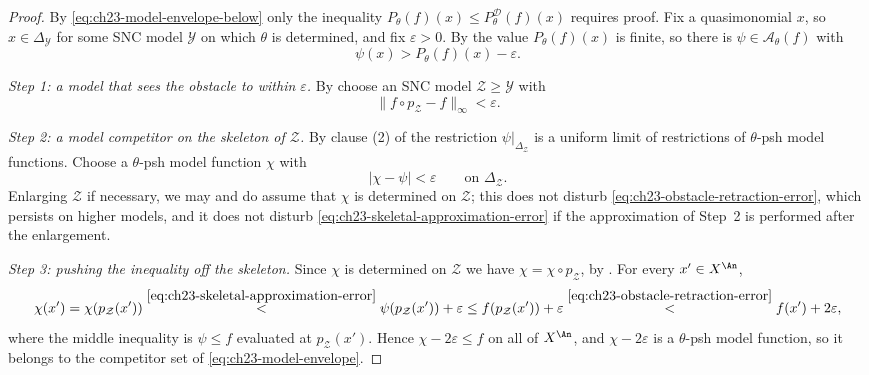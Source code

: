 \begin{proof}
By \eqref{eq:ch23-model-envelope-below} only the inequality
\(P_\theta(f)(x)\leq P^{\mathcal D}_\theta(f)(x)\) requires proof.  Fix a
quasimonomial \(x\), so \(x\in\Delta_{\mathcal Y}\) for some SNC model
\(\mathcal Y\) on which \(\theta\) is determined, and fix \(\varepsilon>0\).
By  the value \(P_\theta(f)(x)\) is finite,
so there is \(\psi\in\mathcal A_\theta(f)\) with
\begin{equation}\label{eq:ch23-competitor-near-x}
 \psi(x)>P_\theta(f)(x)-\varepsilon .
\end{equation}

\emph{Step 1: a model that sees the obstacle to within \(\varepsilon\).}
By  choose an SNC model
\(\mathcal Z\geq\mathcal Y\) with
\begin{equation}\label{eq:ch23-obstacle-retraction-error}
 \|f\circ p_{\mathcal Z}-f\|_\infty<\varepsilon .
\end{equation}

\emph{Step 2: a model competitor on the skeleton of \(\mathcal Z\).}
By clause (2) of  the restriction
\(\psi|_{\Delta_{\mathcal Z}}\) is a uniform limit of restrictions of
\(\theta\)-psh model functions.  Choose a \(\theta\)-psh model function
\(\chi\) with
\begin{equation}\label{eq:ch23-skeletal-approximation-error}
 \bigl|\chi-\psi\bigr|<\varepsilon
 \qquad\text{on }\Delta_{\mathcal Z}.
\end{equation}
Enlarging \(\mathcal Z\) if necessary, we may and do assume that \(\chi\) is
determined on \(\mathcal Z\); this does not disturb
\eqref{eq:ch23-obstacle-retraction-error}, which persists on higher models,
and it does not disturb \eqref{eq:ch23-skeletal-approximation-error} if the
approximation of Step~2 is performed after the enlargement.

\emph{Step 3: pushing the inequality off the skeleton.}  Since \(\chi\) is
determined on \(\mathcal Z\) we have \(\chi=\chi\circ p_{\mathcal Z}\), by
.  For every \(x'\in X^{\An}\),
\[
 \chi(x')=\chi(p_{\mathcal Z}(x'))
 \overset{\eqref{eq:ch23-skeletal-approximation-error}}{<}
 \psi(p_{\mathcal Z}(x'))+\varepsilon
 \leq f(p_{\mathcal Z}(x'))+\varepsilon
 \overset{\eqref{eq:ch23-obstacle-retraction-error}}{<}
 f(x')+2\varepsilon ,
\]
where the middle inequality is \(\psi\leq f\) evaluated at
\(p_{\mathcal Z}(x')\).  Hence
\(\chi-2\varepsilon\leq f\) on all of \(X^{\An}\), and
\(\chi-2\varepsilon\) is a \(\theta\)-psh model function, so it belongs to
the competitor set of \eqref{eq:ch23-model-envelope}.


\end{proof}
